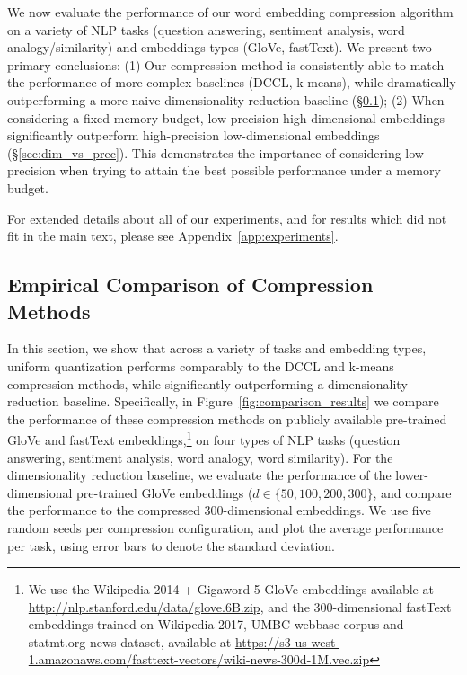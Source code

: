 We now evaluate the performance of our word embedding compression algorithm on a variety of NLP tasks (question answering, sentiment analysis, word analogy/similarity) and embeddings types (GloVe, fastText).
We present two primary conclusions:
(1) Our compression method is consistently able to match the performance of more complex baselines (DCCL, k-means), while dramatically outperforming a more naive dimensionality reduction baseline (\S\ref{sec:exp_comparison});
(2) When considering a fixed memory budget, low-precision high-dimensional embeddings significantly outperform high-precision low-dimensional embeddings (\S\ref{sec:dim_vs_prec}).
This demonstrates the importance of considering low-precision when trying to attain the best possible performance under a memory budget.

For extended details about all of our experiments, and for results which did not fit in the main text, please see Appendix~\ref{app:experiments}.

\subsection{Empirical Comparison of Compression Methods}
\label{sec:exp_comparison}
In this section, we show that across a variety of tasks and embedding types, uniform quantization performs comparably to the DCCL and k-means compression methods, while significantly outperforming a dimensionality reduction baseline.
Specifically, in Figure~\ref{fig:comparison_results} we compare the performance of these compression methods on publicly available pre-trained GloVe and fastText embeddings,\footnote{We use the Wikipedia 2014 + Gigaword 5 GloVe embeddings available at \url{http://nlp.stanford.edu/data/glove.6B.zip}, and the 300-dimensional fastText embeddings trained on Wikipedia 2017, UMBC webbase corpus and statmt.org news dataset, available at \url{https://s3-us-west-1.amazonaws.com/fasttext-vectors/wiki-news-300d-1M.vec.zip}}
on four types of NLP tasks (question answering, sentiment analysis, word analogy, word similarity).
For the dimensionality reduction baseline, we evaluate the performance of the lower-dimensional pre-trained GloVe embeddings ($d\in\{50,100,200,300\}$, and compare the performance to the compressed 300-dimensional embeddings.
We use five random seeds per compression configuration, and plot the average performance per task, using error bars to denote the standard deviation.

